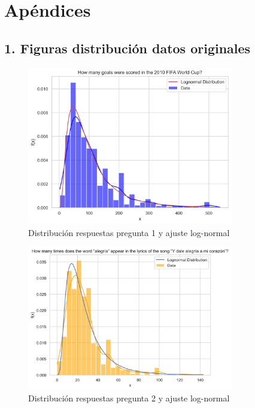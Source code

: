 %
\chapter{Apéndices}
\label{ch::capitulo10}

\section*{1. Figuras distribución datos originales}
 \label{appendix1}

\begin{figure}[h]
\centering
    \includegraphics[width=0.8\textwidth]{figures/appendix_1/goals_distribution_log.png}
\caption{Distribución respuestas pregunta 1 y ajuste log-normal}
\end{figure}

\begin{figure}[h]
\centering
    \includegraphics[width=0.8\textwidth]{figures/appendix_1/alegria_distribution_log.png}
\caption{Distribución respuestas pregunta 2 y ajuste log-normal}
\end{figure}

